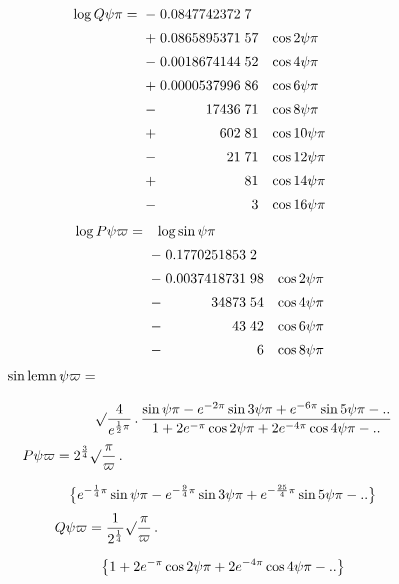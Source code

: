 \[
\begin{array}{r@{\;}c@{\;}r@{\;}l@{\quad}l}
\log Q\psi\pi={}&-&0.0847742372&7&\\[5pt]
&+&0.0865895371&57&\cos2\psi\pi\\[5pt]
&-&0.0018674144&52&\cos4\psi\pi\\[5pt]
&+&0.0000537996&86&\cos6\psi\pi\\[5pt]
&-&17436&71&\cos8\psi\pi\\[5pt]
&+&602&81&\cos10\psi\pi\\[5pt]
&-&21&71&\cos12\psi\pi\\[5pt]
&+&&81&\cos14\psi\pi\\[5pt]
&-&&\phantom{0}3&\cos16\psi\pi
\end{array}
\]
\[
\begin{array}{r@{\;}c@{\;}r@{\;}l@{\quad}l}
\log P\psi\varpi={}&\multicolumn{4}{l}{\log\sin\psi\pi}\\[5pt]
&-&0.1770251853&2&\\[5pt]
&-&0.0037418731&98&\cos2\psi\pi\\[5pt]
&-&34873&54&\cos4\psi\pi\\[5pt]
&-&43&42&\cos6\psi\pi\\[5pt]
&-&&\phantom{0}6&\cos8\psi\pi
\end{array}
\]
\[
\begin{aligned}\sin\operatorname{lemn}\psi\varpi
&=\\[8pt]&\quad{}\surd\dfrac{4}{e^{\frac12\pi}}\, .\,
\dfrac{\sin\psi\pi-e^{-2\pi}\sin3\psi\pi+e^{-6\pi}\sin5\psi\pi-\mathord{.}\mathord{.}}
{1+2e^{-\pi}\cos2\psi\pi+2e^{-4\pi}\cos4\psi\pi-\mathord{.}\mathord{.}}\end{aligned}
\]
\[
\begin{aligned}P\psi\varpi&=2^{\frac34}\surd\dfrac{\pi}{\varpi}\, .\,
\\[7pt]&\quad{}\bigl\{e^{-\frac14\pi}\sin\psi\pi-e^{-\frac94\pi}\sin3\psi\pi
+e^{-\frac{25}{4}\pi}\sin5\psi\pi-\mathord{.}\mathord{.}\bigr\}\end{aligned}
\]
\[
\begin{aligned}Q\psi\varpi&=\dfrac{1}{2^{\frac14}}\surd\dfrac{\pi}{\varpi}\, .\,
\\[7pt]&\quad{}\bigl\{1+2e^{-\pi}\cos2\psi\pi+2e^{-4\pi}\cos4\psi\pi-\mathord{.}\mathord{.}\bigr\}\end{aligned}
\]
